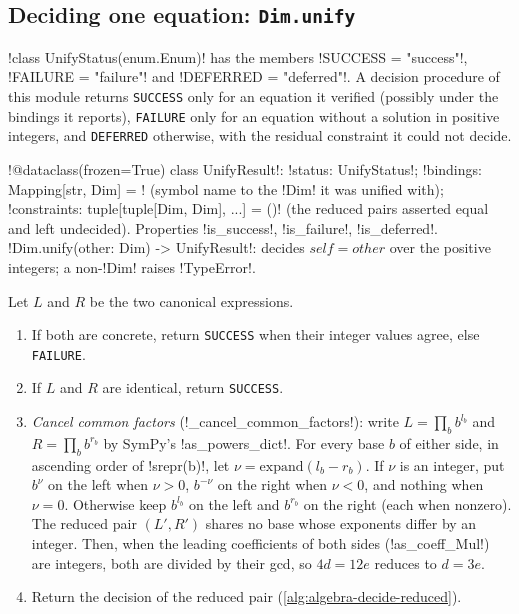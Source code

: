 \subsection{Deciding one equation: \texttt{Dim.unify}}\label{sec:algebra-unify}

\begin{definition}\label{def:algebra-unify-status}
\py!class UnifyStatus(enum.Enum)! has the members \py!SUCCESS = "success"!, \py!FAILURE = "failure"! and \py!DEFERRED = "deferred"!. A decision procedure of this module returns \texttt{SUCCESS} only for an equation it verified (possibly under the bindings it reports), \texttt{FAILURE} only for an equation without a solution in positive integers, and \texttt{DEFERRED} otherwise, with the residual constraint it could not decide.
\end{definition}

\begin{signature}
\py!@dataclass(frozen=True) class UnifyResult!: \py!status: UnifyStatus!; \py!bindings: Mapping[str, Dim] = {}! (symbol name to the \py!Dim! it was unified with); \py!constraints: tuple[tuple[Dim, Dim], ...] = ()! (the reduced pairs asserted equal and left undecided). Properties \py!is_success!, \py!is_failure!, \py!is_deferred!.\\
\py!Dim.unify(other: Dim) -> UnifyResult!: decides $\mathit{self}=\mathit{other}$ over the positive integers; a non-\py!Dim! raises \py!TypeError!.
\end{signature}

\begin{algorithm}\label{alg:algebra-unify}
Let $L$ and $R$ be the two canonical expressions.
\begin{enumerate}
\item If both are concrete, return \texttt{SUCCESS} when their integer values agree, else \texttt{FAILURE}.
\item If $L$ and $R$ are identical, return \texttt{SUCCESS}.
\item \emph{Cancel common factors} (\py!_cancel_common_factors!): write $L=\prod_b b^{l_b}$ and $R=\prod_b b^{r_b}$ by SymPy's \py!as_powers_dict!. For every base $b$ of either side, in ascending order of \py!srepr(b)!, let $\nu=\mathrm{expand}(l_b-r_b)$. If $\nu$ is an integer, put $b^{\nu}$ on the left when $\nu>0$, $b^{-\nu}$ on the right when $\nu<0$, and nothing when $\nu=0$. Otherwise keep $b^{l_b}$ on the left and $b^{r_b}$ on the right (each when nonzero). The reduced pair $(L',R')$ shares no base whose exponents differ by an integer. Then, when the leading coefficients of both sides (\py!as_coeff_Mul!) are integers, both are divided by their gcd, so $4d=12e$ reduces to $d=3e$.
\item Return the decision of the reduced pair (\cref{alg:algebra-decide-reduced}).
\end{enumerate}
\end{algorithm}

